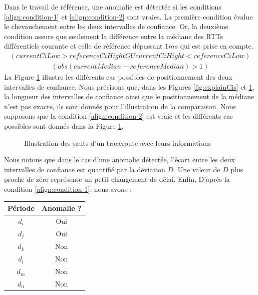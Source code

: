 Dans le travail de référence, une anomalie est détectée si les conditions \ref{align:condition-1} et \ref{align:condition-2} sont vraies. La première condition évalue le chevauchement entre les deux intervalles de confiance. Or, la deuxième condition assure que seulement la  différence entre la médiane des RTTs différentiels courante et celle de référence dépassant $1 ms$ qui est prise en compte.
\begin{align}
(currentCiLow > referenceCiHight OU  currentCiHight <  referenceCiLow) \label{align:condition-1}
\end{align}
\begin{align}
(abs(currentMedian - referenceMedian) > 1 ) \label{align:condition-2}
\end{align}
La Figure \ref{fig:anomalies} illustre les différents cas possibles de positionnement des deux intervalles de confiance. Nous précisons que,  dans les Figures	\ref{fig:explainCis} et \ref{fig:anomalies},  la longueur des intervalles de confiance ainsi que le positionnement de la médiane n'est pas exacte, ils sont donnés pour l'illustration de la comparaison. Nous supposons que la condition \ref{align:condition-2} est vraie et les différents cas possibles sont donnés dans la Figure 	\ref{fig:anomalies}.

\begin{figure}[H]
	\centering
	\captionsetup{justification=centering}
	\resizebox{\textwidth}{!}{
		
	}
	\caption{Illustration des sauts d'un traceroute avec leurs informations}
	\label{fig:anomalies}
\end{figure}


Nous notons que dans le cas d'une anomalie détectée, l'écart entre les deux intervalles de confiance est quantifié par la déviation $D$. Une valeur de $D$ plus proche de zéro représente un petit changement de délai. Enfin, D'après la condition  \ref{align:condition-1}, nous avons :
\begin{table}[H]
	\centering
	\begin{tabular}{cc}
		\textbf{Période} & \textbf{Anomalie ?}\\ \hline
		$d_i$& Oui \\ \hline
		$d_j$ & Oui\\ \hline
		$d_k$& Non\\ \hline
		$d_l$& Non\\ \hline
		$d_m$ & Non \\ \hline
		$d_n$ & Non\\ \hline
	\end{tabular}
\end{table}

